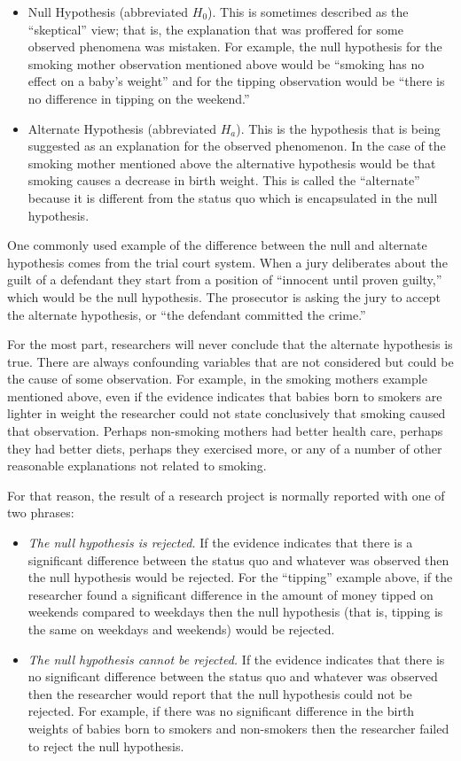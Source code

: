 \begin{itemize}
  \item Null Hypothesis (abbreviated $ H_{0} $). This is sometimes described as the ``skeptical'' view; that is, the explanation that was proffered for some observed phenomena was mistaken. For example, the null hypothesis for the smoking mother observation mentioned above would be ``smoking has no effect on a baby's weight'' and for the tipping observation would be ``there is no difference in tipping on the weekend.''
  \item Alternate Hypothesis (abbreviated $ H_{a} $). This is the hypothesis that is being suggested as an explanation for the observed phenomenon. In the case of the smoking mother mentioned above the alternative hypothesis would be that smoking causes a decrease in birth weight. This is called the ``alternate'' because it is different from the status quo which is encapsulated in the null hypothesis.
\end{itemize}

One commonly used example of the difference between the null and alternate hypothesis comes from the trial court system. When a jury deliberates about the guilt of a defendant they start from a position of ``innocent until proven guilty,'' which would be the null hypothesis. The prosecutor is asking the jury to accept the alternate hypothesis, or ``the defendant committed the crime.'' 

For the most part, researchers will never conclude that the alternate hypothesis is true. There are always confounding variables that are not considered but could be the cause of some observation. For example, in the smoking mothers example mentioned above, even if the evidence indicates that babies born to smokers are lighter in weight the researcher could not state conclusively that smoking caused that observation. Perhaps non-smoking mothers had better health care, perhaps they had better diets, perhaps they exercised more, or any of a number of other reasonable explanations not related to smoking. 

For that reason, the result of a research project is normally reported with one of two phrases: 

\begin{itemize}
  \item \textit{The null hypothesis is rejected.} If the evidence indicates that there is a significant difference between the status quo and whatever was observed then the null hypothesis would be rejected. For the ``tipping'' example above, if the researcher found a significant difference in the amount of money tipped on weekends compared to weekdays then the null hypothesis (that is, tipping is the same on weekdays and weekends) would be rejected.
  \item \textit{The null hypothesis cannot be rejected.} If the evidence indicates that there is no significant difference between the status quo and whatever was observed then the researcher would report that the null hypothesis could not be rejected. For example, if there was no significant difference in the birth weights of babies born to smokers and non-smokers then the researcher failed to reject the null hypothesis.
\end{itemize}

